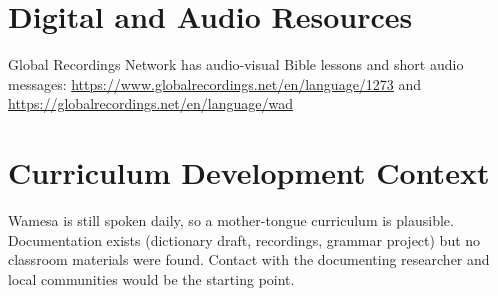 \documentclass[12pt]{article}
\begin{document}
\section{Digital and Audio Resources}
Global Recordings Network has audio-visual Bible lessons and short audio messages: \url{https://www.globalrecordings.net/en/language/1273} and \url{https://globalrecordings.net/en/language/wad}

\section{Curriculum Development Context}
Wamesa is still spoken daily, so a mother-tongue curriculum is plausible. Documentation exists (dictionary draft, recordings, grammar project) but no classroom materials were found. Contact with the documenting researcher and local communities would be the starting point.
\end{document}
